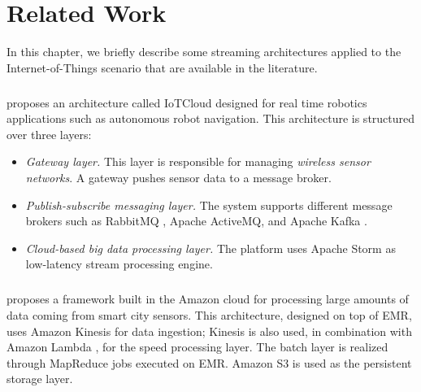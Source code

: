 \chapter{Related Work}
In this chapter, we briefly describe some streaming architectures applied to the Internet-of-Things scenario that are available in the literature.  

\paragraph{}
\cite{sensorsdatainthecloud} proposes an architecture called IoTCloud designed for real time robotics applications such as autonomous robot navigation. This architecture is structured over three layers:
\begin{itemize}
\item	 \emph{Gateway layer.} This layer is responsible for managing \emph{wireless sensor networks}. A gateway pushes sensor data to a message broker.
\item \emph{Publish-subscribe messaging layer.} The system supports different message brokers such as RabbitMQ \cite{rabbitmqonline}, Apache ActiveMQ\cite{apacheactivemqonline}, and Apache Kafka \cite{apachekafkaonline}. 
\item \emph{Cloud-based big data processing layer.} The platform uses Apache Storm as low-latency stream processing engine.
\end{itemize}



\paragraph{}
\cite{lambdaarchitecturecosteffective} proposes a framework built in the Amazon cloud for processing large amounts of data coming from smart city sensors. This architecture, designed on top of EMR, uses Amazon Kinesis \cite{amazonkinesisonline} for data ingestion; Kinesis is also used, in combination with Amazon Lambda \cite{amazonlambdaonline}, for the speed processing layer. The batch layer is realized through MapReduce jobs executed on EMR. Amazon S3 is used as the persistent storage layer. 


